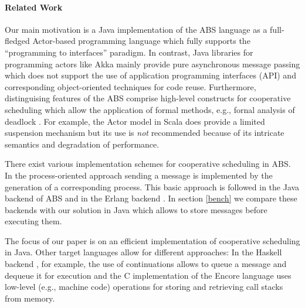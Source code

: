 \paragraph{Related Work}

Our main motivation is  a Java  implementation of the ABS language  as a full-fledged Actor-based programming language which fully supports   the ``programming to interfaces'' paradigm.
In contrast,  Java libraries for programming actors like Akka  \cite{Akka} mainly  provide  pure asynchronous  message passing which does not  support the use of application programming interfaces (API) and corresponding object-oriented techniques for code reuse.
Furthermore,  distinguising features of the ABS comprise  high-level constructs for cooperative scheduling which allow the application of formal methods, e.g.,
fornal analysis of deadlock \cite{deadlock}.
For example,   the Actor model in Scala \cite{Scala} does provide a limited suspension mechanism but its use is \emph{not} recommended because of its intricate semantics and degradation of  performance.

There exist various implementation schemes for cooperative scheduling in ABS.
In the process-oriented approach sending a message  is implemented by the generation of a  corresponding process. This basic approach is followed in the Java backend of ABS \cite{abs,Schafer} and in the Erlang backend \cite{Erlang}.
In section \ref{bench} we compare these backends with our solution in Java which allows to store messages before executing them.

The focus of our paper is  on an efficient implementation of cooperative scheduling in Java.
Other target languages allow for different approaches:
In the Haskell backend \cite{Haskell}, for example,   the use of continuations allows
to queue  a message and dequeue it for execution and the C implementation of the
Encore language \cite{Encore}  uses low-level (e.g., machine code) operations for
storing and retrieving call stacks from memory.






